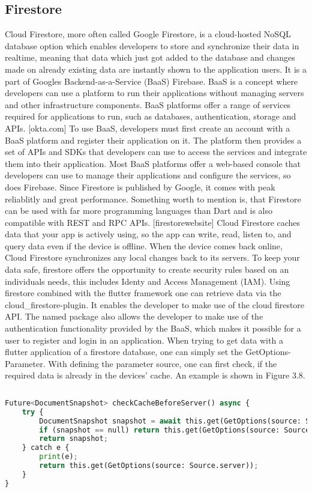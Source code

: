 \subsection{Firestore}
Cloud Firestore, more often called Google Firestore, is a cloud-hosted NoSQL database option which enables developers to store and synchronize their data in realtime, meaning that data which just got added to the database and changes made on already existing data are instantly shown to the application users. It is a part of Googles Backend-as-a-Service (BaaS) Firebase. BaaS is a concept where developers can use a platform to run their applications without managing servers and other infrastructure components. BaaS platforms offer a range of services required for applications to run, such as databases, authentication, storage and APIs. [okta.com] To use BaaS, developers must first create an account with a BaaS platform and register their application on it. The platform then provides a set of APIs and SDKs that developers can use to access the services and integrate them into their application. Most BaaS platforms offer a web-based console that developers can use to manage their applications and configure the services, so does Firebase. Since Firestore is published by Google, it comes with peak reliablitly and great performance. Something worth to mention is, that Firestore can be used with far more programming languages than Dart and is also compatible with REST and RPC APIs. [firestorewebsite] Cloud Firestore caches data that your app is actively using, so the app can write, read, listen to, and query data even if the device is offline. When the device comes back online, Cloud Firestore synchronizes any local changes back to its servers. To keep your data safe, firestore offers the opportunity to create security rules based on an individuals needs, this includes Identy and Access Management (IAM). Using firestore combined with the flutter framework one can retrieve data via the cloud\_firestore-plugin. It enables the developer to make use of the cloud firestore API. The named package also allows the developer to make use of the authentication functionality provided by the BaaS, which makes it possible for a user to register and login in an application. When trying to get data with a flutter application of a firestore database, one can simply set the GetOptions-Parameter. With defining the parameter source, one can first check, if the required data is already in the devices' cache. An example is shown in Figure 3.8.

\begin{lstlisting}[language=Python, caption={Dart - Firestore-Query}]
	
Future<DocumentSnapshot> checkCacheBeforeServer() async {
	try {
		DocumentSnapshot snapshot = await this.get(GetOptions(source: Source.cache));
		if (snapshot == null) return this.get(GetOptions(source: Source.server));
		return snapshot;
	} catch e {
		print(e);
		return this.get(GetOptions(source: Source.server));
	}
}
	
\end{lstlisting}
\noindent


